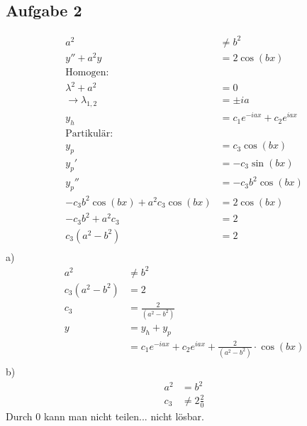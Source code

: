 \documentclass{article}
\begin{document}
\subsection*{Aufgabe 2}
\begin{align*}
    a^2 &\neq b^2\\y''+a^2y&=2\cos(bx)\\
    \text{Homogen:}\\
    \lambda^2+a^2&=0\\
    \rightarrow\lambda_{1,2} &= \pm ia\\
    y_h &= c_1 e^{-iax}+c_2e^{iax}\\
    \text{Partikulär:}\\
    y_p &= c_3 \cos(bx)\\
    y_p' &= -c_3\sin(bx)\\
    y_p''&=-c_3b^2\cos(bx)\\
    -c_3b ^2\cos(bx)+a^2c_3\cos(bx)&=2\cos(bx)\\
    -c_3b^2+a^2c_3&=2\\
    c_3(a^2-b^2)&=2\\
\end{align*}
a)
\begin{align*}
    a^2 &\neq b^2\\
    c_3(a^2-b^2)&=2\\
    c_3 &= \frac{2}{(a^2-b^2)}\\
    y&=y_h+y_p\\
    &= c_1e^{-iax}+c_2e^{iax}+\frac{2}{(a^2-b^2)}\cdot \cos(bx)\\
\end{align*}
b)
\begin{align*}
    a^2 &= b^2\\
    c_3 &\neq 2\frac{2}{0}
\end{align*}
Durch 0 kann man nicht teilen... nicht lösbar.
\end{document}
